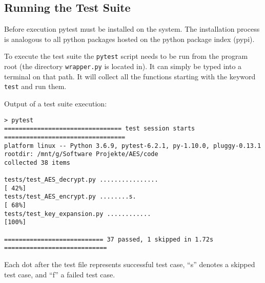 \subsection{Running the Test Suite}
Before execution pytest must be installed on the system. The installation process is analogous to all python packages hosted on the python package index (pypi).

To execute the test suite the \lstinline|pytest| script needs to be run from the program root (the directory \lstinline|wrapper.py| is located in). It can simply be typed into a terminal on that path. It will collect all the functions starting with the keyword \lstinline|test| and run them.

Output of a test suite execution:
\begin{lstlisting}
> pytest
================================ test session starts =================================
platform linux -- Python 3.6.9, pytest-6.2.1, py-1.10.0, pluggy-0.13.1
rootdir: /mnt/g/Software Projekte/AES/code
collected 38 items

tests/test_AES_decrypt.py ................                                     [ 42%]
tests/test_AES_encrypt.py ........s.                                           [ 68%]
tests/test_key_expansion.py ............                                       [100%]

=========================== 37 passed, 1 skipped in 1.72s ============================
\end{lstlisting}

Each dot after the test file represents successful test case, \enquote{s} denotes a skipped test case, and \enquote{f} a failed test case.

